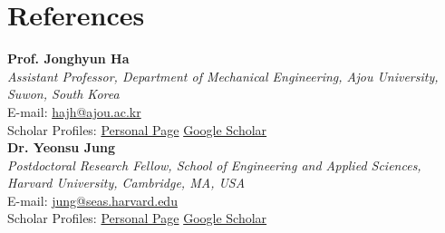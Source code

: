 \documentclass[a4paper,10pt]{article}
\newcommand{\sep}{\hspace{6pt}\textcolor{muted}{\textbar}\hspace{6pt}}
\begin{document}
\section*{References}
\textbf{Prof. Jonghyun Ha}\\
\textit{Assistant Professor, Department of Mechanical Engineering, Ajou University, Suwon, South Korea}\\
E-mail: \href{mailto:hajh@ajou.ac.kr}{hajh@ajou.ac.kr}\\
Scholar Profiles:
\href{https://www.softlab.ajou.ac.kr/people-ha}{Personal Page} \sep
\href{https://scholar.google.com/citations?user=H73RmsAAAAAJ}{Google Scholar}\\[5pt]

\textbf{Dr. Yeonsu Jung}\\
\textit{Postdoctoral Research Fellow, School of Engineering and Applied Sciences, Harvard University, Cambridge, MA, USA}\\
E-mail: \href{mailto:jung@seas.harvard.edu}{jung@seas.harvard.edu}\\
Scholar Profiles:
\href{https://yeonsu-jung.github.io}{Personal Page} \sep
\href{https://scholar.google.com/citations?user=BMZc1CcAAAAJ}{Google Scholar}
\end{document}
